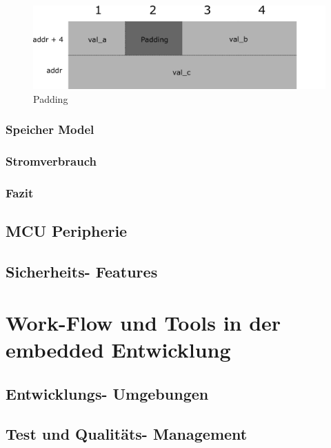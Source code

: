 \documentclass[MES,Master,ngerman]{twbook}%
\begin{document}
\begin{figure}[!htb]
	\centering
	\begin{subfigure}[b]{0.5\textwidth}
		
		\label{lst:01}
	\end{subfigure}
\end{figure}

\begin{figure}[h]
	\centering
	\includegraphics[scale=1.3]{../Grafiken/padding.png}
	\caption{Padding}
	\label{fig:32}
\end{figure}




\subsubsection{Speicher Model}
\subsubsection{Stromverbrauch}
\subsubsection{Fazit}
\subsection{MCU Peripherie}
\subsection{Sicherheits- Features}
\section{Work-Flow und Tools in der embedded Entwicklung}
\subsection{Entwicklungs- Umgebungen}
\subsection{Test und Qualitäts- Management}
\end{document}
